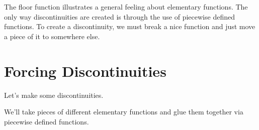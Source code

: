\documentclass{ximera}
\begin{document}
The floor function illustrates a general feeling about elementary functions. The only way discontinuities are created is through the use of piecewise defined functions.  To create a discontinuity, we must break a nice function and just move a piece of it to somewhere else.











\section*{Forcing Discontinuities}



Let's make some discontinuities.

We'll take pieces of different elementary functions and glue them together via piecewise defined functions. 
\end{document}
